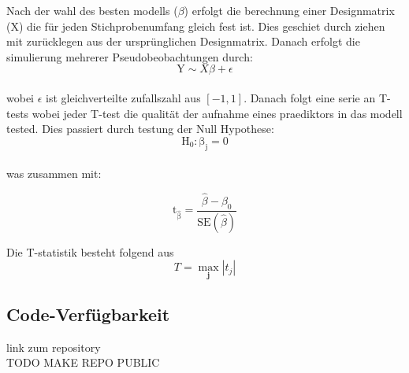 Nach der wahl des besten modells ($\beta$) erfolgt die berechnung einer Designmatrix (X) die für jeden Stichprobenumfang gleich fest ist. Dies geschiet durch ziehen mit zurücklegen aus der ursprünglichen Designmatrix.
Danach erfolgt die simulierung mehrerer Pseudobeobachtungen durch:\\
\[\mathrm{Y} \sim X\beta + \epsilon \]\\
wobei $\epsilon$ ist gleichverteilte zufallszahl aus $[-1,1]$. 
Danach folgt eine serie an T-tests wobei jeder T-test die qualität der aufnahme eines praediktors in das modell tested. Dies passiert durch testung der Null Hypothese:\\
\[\mathrm{H_0 : \beta_j}  = 0 \]\\
was zusammen mit:

\[\mathrm{t_{\hat{\beta}} =} \frac{\hat{\beta} - \beta_0}{\mathrm{SE}(\hat{\beta})}\]

Die T-statistik besteht folgend aus 
\begin{equation}
T = \mathop{max}_{\textbf{j}}|t_j|
\end{equation}


\subsection{Code-Verfügbarkeit}
link zum repository\\
TODO MAKE REPO PUBLIC